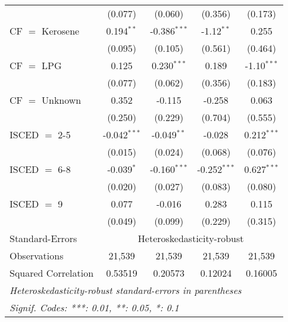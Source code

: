 \begin{table}[htbp!]
\begin{adjustbox}{width = 1\textwidth, max height = 0.95\textheight, center}
\begin{threeparttable}[b]
\begin{tabular}{lcccc}
                                 & (0.077)            & (0.060)            & (0.356)        & (0.173)\\   
            CF $=$ Kerosene      & 0.194$^{**}$       & -0.386$^{***}$     & -1.12$^{**}$   & 0.255\\   
                                 & (0.095)            & (0.105)            & (0.561)        & (0.464)\\   
            CF $=$ LPG           & 0.125              & 0.230$^{***}$      & 0.189          & -1.10$^{***}$\\   
                                 & (0.077)            & (0.062)            & (0.356)        & (0.183)\\   
            CF $=$ Unknown       & 0.352              & -0.115             & -0.258         & 0.063\\   
                                 & (0.250)            & (0.229)            & (0.704)        & (0.555)\\   
            ISCED $=$ 2-5        & -0.042$^{***}$     & -0.049$^{**}$      & -0.028         & 0.212$^{***}$\\   
                                 & (0.015)            & (0.024)            & (0.068)        & (0.076)\\   
            ISCED $=$ 6-8        & -0.039$^{*}$       & -0.160$^{***}$     & -0.252$^{***}$ & 0.627$^{***}$\\   
                                 & (0.020)            & (0.027)            & (0.083)        & (0.080)\\   
            ISCED $=$ 9          & 0.077              & -0.016             & 0.283          & 0.115\\   
                                 & (0.049)            & (0.099)            & (0.229)        & (0.315)\\   
            \midrule 
            Standard-Errors & \multicolumn{4}{c}{Heteroskedasticity-robust} \\ 
            Observations         & 21,539             & 21,539             & 21,539         & 21,539\\  
            Squared Correlation  & 0.53519            & 0.20573            & 0.12024        & 0.16005\\  
            \midrule \midrule
            \multicolumn{5}{l}{\emph{Heteroskedasticity-robust standard-errors in parentheses}}\\
            \multicolumn{5}{l}{\emph{Signif. Codes: ***: 0.01, **: 0.05, *: 0.1}}\\
         \end{tabular}
         

\end{threeparttable}
\end{adjustbox}
\end{table}
